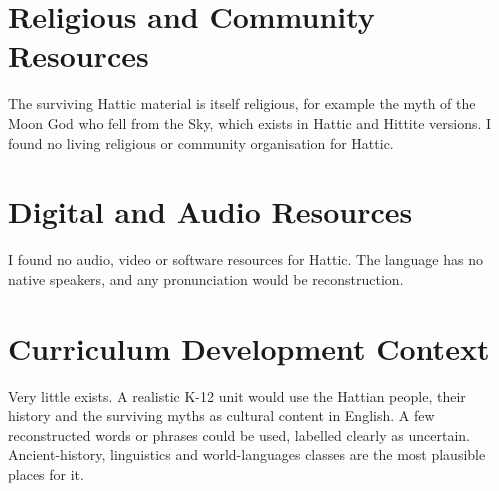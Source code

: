 \documentclass[12pt]{article}
\begin{document}
\section{Religious and Community Resources}
The surviving Hattic material is itself religious, for example the myth of the Moon God who fell from the Sky, which exists in Hattic and Hittite versions. I found no living religious or community organisation for Hattic.

\section{Digital and Audio Resources}
I found no audio, video or software resources for Hattic. The language has no native speakers, and any pronunciation would be reconstruction.

\section{Curriculum Development Context}
Very little exists. A realistic K-12 unit would use the Hattian people, their history and the surviving myths as cultural content in English. A few reconstructed words or phrases could be used, labelled clearly as uncertain. Ancient-history, linguistics and world-languages classes are the most plausible places for it.
\end{document}
